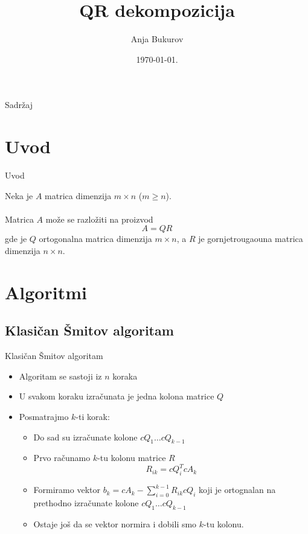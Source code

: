 \documentclass[serbian]{beamer}
\title[QR dekompozicija]{QR dekompozicija}
\author{Anja Bukurov}
\institute{Matematički fakultet, \\ Univerzitet u Beogradu}
\date{\today.}
\begin{document}
\begin{frame}
  	\titlepage
\end{frame}

\begin{frame}{Sadržaj}
  	\tableofcontents
\end{frame}

\section{Uvod}

\begin{frame}{Uvod}

	Neka je $A$ matrica dimenzija $m\times n$ ($m \geq n$).
	\\ ~
	\\
	Matrica $A$ može se razložiti na proizvod
	$$A = QR$$
	gde je $Q$ ortogonalna matrica dimenzija $m \times n$, a $R$ je gornjetrougaouna matrica dimenzija $n \times n$.
	
\end{frame}

\section{Algoritmi}

\subsection{Klasičan Šmitov algoritam}
\begin{frame}{Klasičan Šmitov algoritam}

\begin{itemize}
	\item Algoritam se sastoji iz $n$ koraka
	\item U svakom koraku izračunata je jedna kolona matrice $Q$
	\item Posmatrajmo $k$-ti korak:
	\begin{itemize}
		\item Do sad su izračunate kolone $cQ_1 \ldots cQ_{k-1}$
		\item Prvo računamo $k$-tu kolonu matrice $R$ 
		$$R_{ik} = cQ_i^TcA_k$$
		\item Formiramo vektor $b_k = cA_k − \sum_{i=0}^{k-1}R_{ik}cQ_i$ koji je ortognalan na prethodno izračunate kolone $cQ_1 \ldots cQ_{k-1}$
		\item Ostaje još da se vektor normira i dobili smo $k$-tu kolonu.
	\end{itemize}
\end{itemize}

\end{frame}
\end{document}

